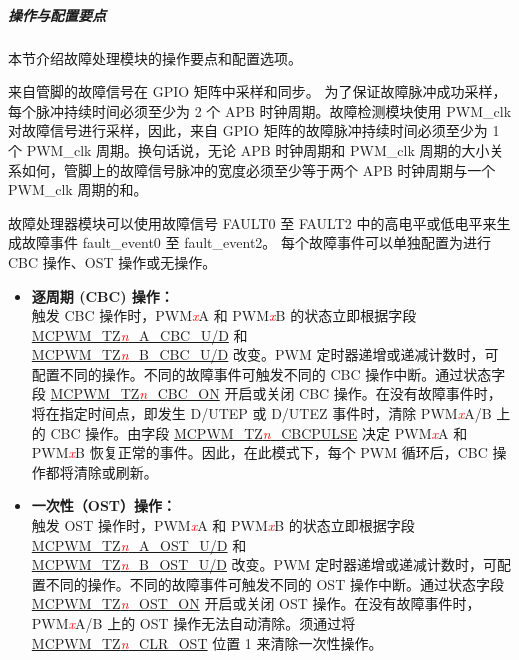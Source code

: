 \documentclass[main\_\_CN.tex]{subfiles}
\begin{document}
\subparagraph{操作与配置要点}
本节介绍故障处理模块的操作要点和配置选项。

来自管脚的故障信号在 GPIO 矩阵中采样和同步。 为了保证故障脉冲成功采样，每个脉冲持续时间必须至少为 2 个 APB 时钟周期。故障检测模块使用 PWM\_clk 对故障信号进行采样，因此，来自 GPIO 矩阵的故障脉冲持续时间必须至少为 1 个 PWM\_clk 周期。换句话说，无论 APB 时钟周期和 PWM\_clk 周期的大小关系如何，管脚上的故障信号脉冲的宽度必须至少等于两个 APB 时钟周期与一个 PWM\_clk 周期的和。

故障处理器模块可以使用故障信号 FAULT0 至 FAULT2 中的高电平或低电平来生成故障事件 fault\_event0 至 fault\_event2。 每个故障事件可以单独配置为进行 CBC 操作、OST 操作或无操作。

\begin{itemize}
    \item {\bfseries 逐周期 (CBC) 操作：}\\
    触发 CBC 操作时，PWM\textcolor{red}{\it{x}}A 和 PWM\textcolor{red}{\it{x}}B 的状态立即根据字段 \hyperref[fielddesc:MCPWMTZNACBCU]{MCPWM\_TZ\textcolor{red}{\it{n}}\_A\_CBC\_U/D} 和 \\\hyperref[fielddesc:MCPWMTZNBCBCU]{MCPWM\_TZ\textcolor{red}{\it{n}}\_B\_CBC\_U/D} 改变。PWM 定时器递增或递减计数时，可配置不同的操作。不同的故障事件可触发不同的 CBC 操作中断。通过状态字段 \hyperref[fielddesc:MCPWMTZNCBCON]{MCPWM\_TZ\textcolor{red}{\it{n}}\_CBC\_ON} 开启或关闭 CBC 操作。在没有故障事件时，将在指定时间点，即发生 D/UTEP 或 D/UTEZ 事件时，清除 PWM\textcolor{red}{\it{x}}A/B 上的 CBC 操作。由字段 \hyperref[fielddesc:MCPWMTZNCBCPULSE]{MCPWM\_TZ\textcolor{red}{\it{n}}\_CBCPULSE} 决定 PWM\textcolor{red}{\it{x}}A 和 PWM\textcolor{red}{\it{x}}B 恢复正常的事件。因此，在此模式下，每个 PWM 循环后，CBC 操作都将清除或刷新。
    \item {\bfseries 一次性（OST）操作：}\\
	触发 OST 操作时，PWM\textcolor{red}{\it{x}}A 和 PWM\textcolor{red}{\it{x}}B 的状态立即根据字段 \hyperref[fielddesc:MCPWMTZNAOSTU]{MCPWM\_TZ\textcolor{red}{\it{n}}\_A\_OST\_U/D} 和 \\\hyperref[fielddesc:MCPWMTZNBOSTU]{MCPWM\_TZ\textcolor{red}{\it{n}}\_B\_OST\_U/D} 改变。PWM 定时器递增或递减计数时，可配置不同的操作。不同的故障事件可触发不同的 OST 操作中断。通过状态字段  \hyperref[fielddesc:MCPWMTZNOSTON]{MCPWM\_TZ\textcolor{red}{\it{n}}\_OST\_ON} 开启或关闭 OST 操作。在没有故障事件时，PWM\textcolor{red}{\it{x}}A/B 上的 OST 操作无法自动清除。须通过将 \hyperref[fielddesc:MCPWMTZNCLROST]{MCPWM\_TZ\textcolor{red}{\it{n}}\_CLR\_OST} 位置 1 来清除一次性操作。
\end{itemize}
\end{document}
